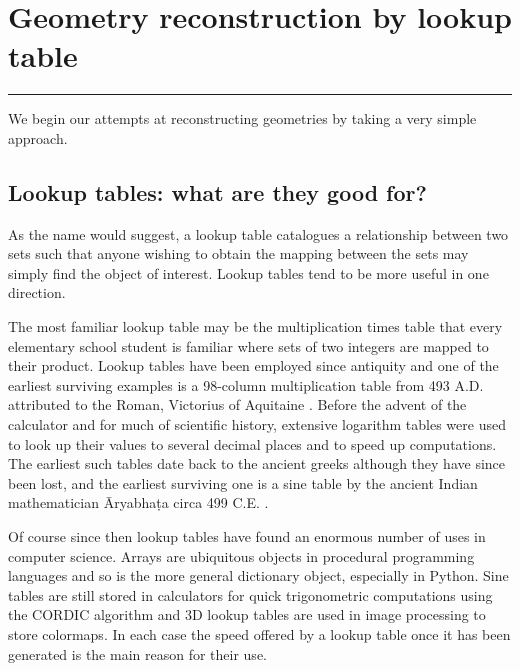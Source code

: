 \chapter{Geometry reconstruction by lookup table}\label{ch:lookupTable}

\vspace{-1.5 em}
\minitoc\hrule
\vspace{1.5 em}

\noindent
We begin our attempts at reconstructing geometries by taking a very simple approach.

\section{Lookup tables: what are they good for?}
As the name would suggest, a lookup table catalogues a relationship between two sets such that anyone wishing to obtain the mapping between the sets may simply find the object of interest. Lookup tables tend to be more useful in one direction.

The most familiar lookup table may be the multiplication times table that every elementary school student is familiar where sets of two integers are mapped to their product. Lookup tables have been employed since antiquity and one of the earliest surviving examples is a 98-column multiplication table from 493 A.D. attributed to the Roman, Victorius of Aquitaine \citep{Maher01}. Before the advent of the calculator and for much of scientific history, extensive logarithm tables were used to look up their values to several decimal places and to speed up computations. The earliest such tables date back to the ancient greeks although they have since been lost, and the earliest surviving one is a sine table by the ancient Indian mathematician \={A}ryabha\d{t}a circa 499 C.E. \citep{Hayashi97}.

Of course since then lookup tables have found an enormous number of uses in computer science. Arrays are ubiquitous objects in procedural programming languages and so is the more general dictionary object, especially in Python. Sine tables are still stored in calculators for quick trigonometric computations using the CORDIC algorithm and 3D lookup tables are used in image processing to store colormaps. In each case the speed offered by a lookup table once it has been generated is the main reason for their use.

